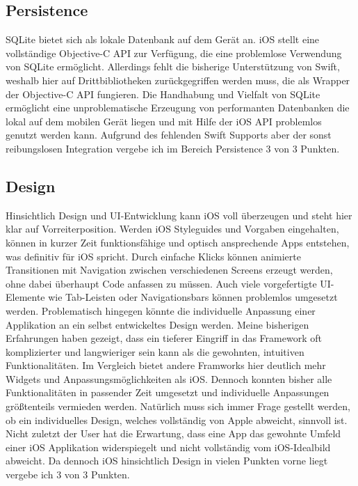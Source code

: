 \subsection{Persistence}
SQLite bietet sich als lokale Datenbank auf dem Gerät an. iOS stellt eine vollständige Objective-C API zur Verfügung, die eine problemlose Verwendung von SQLite ermöglicht. Allerdings fehlt die bisherige Unterstützung von Swift, weshalb hier auf Drittbibliotheken zurückgegriffen werden muss, die als Wrapper der Objective-C API fungieren. Die Handhabung und Vielfalt von SQLite ermöglicht eine unproblematische Erzeugung von performanten Datenbanken die lokal auf dem mobilen Gerät liegen und mit Hilfe der iOS API problemlos genutzt werden kann. Aufgrund des fehlenden Swift Supports aber der sonst reibungslosen Integration vergebe ich im Bereich Persistence 3 von 3 Punkten.
\subsection{Design}
Hinsichtlich Design und UI-Entwicklung kann iOS voll überzeugen und steht hier klar auf Vorreiterposition. Werden iOS Styleguides und Vorgaben eingehalten, können in kurzer Zeit funktionsfähige und optisch ansprechende Apps entstehen, was definitiv für iOS spricht. Durch einfache Klicks können animierte Transitionen mit Navigation zwischen verschiedenen Screens erzeugt werden, ohne dabei überhaupt Code anfassen zu müssen. Auch viele vorgefertigte UI-Elemente wie Tab-Leisten oder Navigationsbars können problemlos umgesetzt werden. Problematisch hingegen könnte die individuelle Anpassung einer Applikation an ein selbst entwickeltes Design werden. Meine bisherigen Erfahrungen haben gezeigt, dass ein tieferer Eingriff in das Framework oft komplizierter und langwieriger sein kann als die gewohnten, intuitiven Funktionalitäten. Im Vergleich bietet andere Framworks hier deutlich mehr Widgets und Anpassungsmöglichkeiten als iOS. Dennoch konnten bisher alle Funktionalitäten in passender Zeit umgesetzt und individuelle Anpassungen größtenteils vermieden werden. Natürlich muss sich immer Frage gestellt werden, ob ein individuelles Design, welches vollständig von Apple abweicht, sinnvoll ist. Nicht zuletzt der User hat die Erwartung, dass eine App das gewohnte Umfeld einer iOS Applikation widerspiegelt und nicht vollständig vom iOS-Idealbild abweicht. Da dennoch iOS hinsichtlich Design in vielen Punkten vorne liegt vergebe ich 3 von 3 Punkten.
